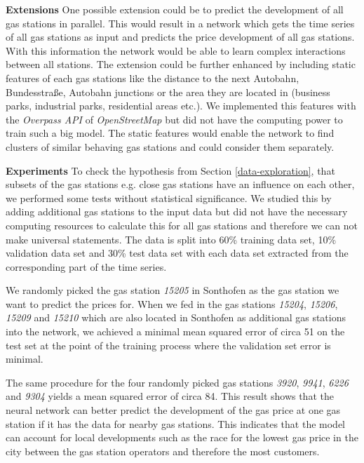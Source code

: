 \documentclass[%
a4paper,
DIV12,
2.5headlines,
bigheadings,
titlepage,
openbib,
]{scrartcl}
\begin{document}
\textbf{Extensions} One possible extension could be to predict the development of all gas stations in parallel.
This would result in a network which gets the time series of all gas stations as input and predicts the price development of all gas stations.
With this information the network would be able to learn complex interactions between all stations.
The extension could be further enhanced by including static features of each gas stations like the distance to the next Autobahn, Bundesstra{\ss}e, Autobahn junctions or the area they are located in (business parks, industrial parks, residential areas etc.).
We implemented this features with the \textit{Overpass API} of \textit{OpenStreetMap} but did not have the computing power to train such a big model.
The static features would enable the network to find clusters of similar behaving gas stations and could consider them separately.

\textbf{Experiments}
To check the hypothesis from Section \ref{data-exploration}, that subsets of the gas stations e.g. close gas stations have an influence on each other, we performed some tests without statistical significance.
We studied this by adding additional gas stations to the input data but did not have the necessary computing resources to calculate this for all gas stations and therefore we can not make universal statements.
The data is split into 60\% training data set, 10\% validation data set and 30\% test data set with each data set extracted from the corresponding part of the time series.

We randomly picked the gas station \textit{15205} in Sonthofen as the gas station we want to predict the prices for.
When we fed in the gas stations \textit{15204}, \textit{15206}, \textit{15209} and \textit{15210} which are also located in Sonthofen as additional gas stations into the network, we achieved a minimal mean squared error of circa 51 on the test set at the point of the training process where the validation set error is minimal.

The same procedure for the four randomly picked gas stations \textit{3920}, \textit{9941}, \textit{6226} and \textit{9304} yields a mean squared error of circa 84.
This result shows that the neural network can better predict the development of the gas price at one gas station if it has the data for nearby gas stations.
This indicates that the model can account for local developments such as the race for the lowest gas price in the city between the gas station operators and therefore the most customers.
\end{document}
